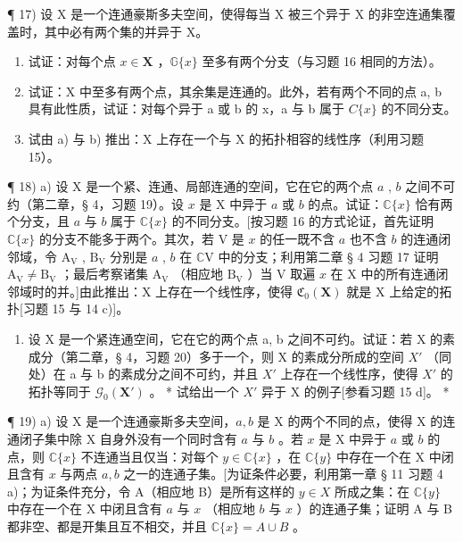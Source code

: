 ¶ 17) 设 X 是一个连通豪斯多夫空间，使得每当 X 被三个异于 X 的非空连通集覆盖时，其中必有两个集的并异于 X。

\begin{enumerate}
\def\labelenumi{\alph{enumi})}
\item
试证：对每个点 \(x \in \mathbf{X}\) ，\(\mathbb{G}\{x\}\) 至多有两个分支（与习题 16 相同的方法）。
\item
试证：X 中至多有两个点，其余集是连通的。此外，若有两个不同的点 a, b 具有此性质，试证：对每个异于 a 或 b 的 x，a 与 b 属于 \(C\{x\}\) 的不同分支。
\item
试由 a) 与 b) 推出：X 上存在一个与 X 的拓扑相容的线性序（利用习题 15）。
\end{enumerate}

¶ 18) a) 设 X 是一个紧、连通、局部连通的空间，它在它的两个点 \(a\) , \(b\) 之间不可约（第二章，§ 4，习题 19）。设 \(x\) 是 X 中异于 \(a\) 或 \(b\) 的点。试证：\(\mathbb{C}\{x\}\) 恰有两个分支，且 \(a\) 与 \(b\) 属于 \(\mathbb{C}\{x\}\) 的不同分支。{[}按习题 16 的方式论证，首先证明 \(\mathbb{C}\{x\}\) 的分支不能多于两个。其次，若 V 是 \(x\) 的任一既不含 \(a\) 也不含 \(b\) 的连通闭邻域，令 \(\mathrm{A}_{\mathrm{V}}\) , \(\mathrm{B}_{\mathrm{V}}\) 分别是 \(a\) , \(b\) 在 \(\mathbb{C}\mathrm{V}\) 中的分支；利用第二章 § 4 习题 17 证明 \(\mathrm{A}_{\mathrm{V}} \neq \mathrm{B}_{\mathrm{V}}\) ；最后考察诸集 \(\mathrm{A}_{\mathrm{V}}\) （相应地 \(\mathrm{B}_{\mathrm{V}}\) ）当 V 取遍 \(x\) 在 X 中的所有连通闭邻域时的并。{]}由此推出：X 上存在一个线性序，使得 \(\mathfrak{C}_{0}(\mathbf{X})\) 就是 X 上给定的拓扑{[}习题 15 与 14 c){]}。

\begin{enumerate}
\def\labelenumi{\alph{enumi})}
\setcounter{enumi}{1}
\tightlist
\item
设 X 是一个紧连通空间，它在它的两个点 a, b 之间不可约。试证：若 X 的素成分（第二章，§ 4，习题 20）多于一个，则 X 的素成分所成的空间 \(X'\) （同处）在 a 与 b 的素成分之间不可约，并且 \(X'\) 上存在一个线性序，使得 \(X'\) 的拓扑等同于 \(\mathcal{G}_{0}(\mathbf{X}')\) 。 * 试给出一个 \(X'\) 异于 X 的例子{[}参看习题 15 d{]}。 *
\end{enumerate}

¶ 19) a) 设 X 是一个连通豪斯多夫空间，\(a, b\) 是 X 的两个不同的点，使得 X 的连通闭子集中除 X 自身外没有一个同时含有 \(a\) 与 \(b\) 。若 \(x\) 是 X 中异于 \(a\) 或 \(b\) 的点，则 \(\mathbb{C}\{x\}\) 不连通当且仅当：对每个 \(y \in \mathbb{C}\{x\}\) ，在 \(\mathbb{C}\{y\}\) 中存在一个在 X 中闭且含有 \(x\) 与两点 \(a, b\) 之一的连通子集。{[}为证条件必要，利用第一章 § 11 习题 4 a)；为证条件充分，令 A（相应地 B）是所有这样的 \(y \in X\) 所成之集：在 \(\mathbb{C}\{y\}\) 中存在一个在 X 中闭且含有 \(a\) 与 \(x\) （相应地 \(b\) 与 \(x\) ）的连通子集；证明 A 与 B 都非空、都是开集且互不相交，并且 \(\mathbb{C}\{x\} = A \cup B\) 。

